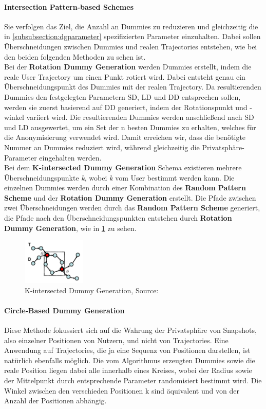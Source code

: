 	\paragraph{Intersection Pattern-based Schemes \cite{Lei2012}} Sie verfolgen das Ziel, die Anzahl an Dummies zu reduzieren und gleichzeitig die in \ref{subsubsection:dgparameter} spezifizierten Parameter einzuhalten. Dabei sollen Überschneidungen zwischen Dummies und realen Trajectories entstehen, wie bei den beiden folgenden Methoden zu sehen ist.\\
	Bei der \textbf{Rotation Dummy Generation} werden Dummies erstellt, indem die reale User Trajectory um einen Punkt rotiert wird. Dabei entsteht genau ein Überschneidungspunkt des Dummies mit der realen Trajectory. Da resultierenden Dummies den festgelegten Parametern SD, LD und DD entsprechen sollen, werden sie zuerst basierend auf DD generiert, indem der Rotationspunkt und -winkel variiert wird. Die resultierenden Dummies werden anschließend nach SD und LD ausgewertet, um ein Set der n besten Dummies zu erhalten, welches für die Anonymisierung verwendet wird. Damit erreichen wir, dass die benötigte Nummer an Dummies reduziert wird, während gleichzeitig die Privatsphäre-Parameter eingehalten werden.\\
	Bei dem \textbf{K-intersected Dummy Generation} Schema existieren mehrere Überschneidungspunkte \textit{k}, wobei \textit{k} vom User bestimmt werden kann. Die einzelnen Dummies werden durch einer Kombination des \textbf{Random Pattern Scheme} und der \textbf{Rotation Dummy Generation} erstellt. Die Pfade zwischen zwei Überschneidungen werden durch das \textbf{Random Pattern Scheme} generiert, die Pfade nach den Überschneidungspunkten entstehen durch \textbf{Rotation Dummy Generation}, wie in \ref{fig_Lei2012KD} zu sehen.
	\begin{figure}[!h]
		\centering
		\includegraphics[width=3cm]{Bilder/Lei2012KD.png}
		\caption{K-intersected Dummy Generation, Source: \protect\cite{Lei2012}}
		\label{fig_Lei2012KD}
	\end{figure}
	\paragraph{Circle-Based Dummy Generation \cite{Lu2008}} Diese Methode fokussiert sich auf die Wahrung der Privatsphäre von Snapshots, also einzelner Positionen von Nutzern, und nicht von Trajectories. Eine Anwendung auf Trajectories, die ja eine Sequenz von Positionen darstellen, ist natürlich ebenfalls möglich. Die vom Algorithmus erzeugten Dummies sowie die reale Position liegen dabei alle innerhalb eines Kreises, wobei der Radius sowie der Mittelpunkt durch entsprechende Parameter randomisiert bestimmt wird. Die Winkel zwischen den verschieden Positionen k sind äquivalent und von der Anzahl der Positionen abhängig.
